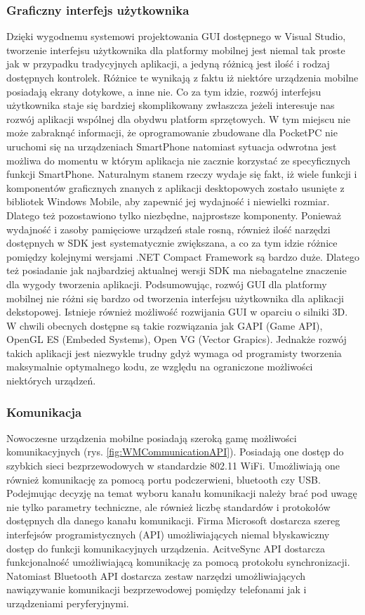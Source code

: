 \subsubsection{Graficzny interfejs użytkownika}
Dzięki wygodnemu systemowi projektowania GUI dostępnego w Visual Studio, tworzenie
interfejsu użytkownika dla platformy mobilnej jest niemal tak proste jak w
przypadku tradycyjnych aplikacji, a jedyną różnicą jest ilość i rodzaj dostępnych
kontrolek. Różnice te wynikają z faktu iż niektóre urządzenia mobilne posiadają
ekrany dotykowe, a inne nie. Co za tym idzie, rozwój interfejsu użytkownika staje
się bardziej skomplikowany zwłaszcza jeżeli interesuje nas rozwój aplikacji
wspólnej dla obydwu platform sprzętowych. W tym miejscu nie może zabraknąć
informacji, że oprogramowanie zbudowane dla PocketPC nie uruchomi się na
urządzeniach SmartPhone natomiast sytuacja odwrotna jest możliwa do momentu w
którym aplikacja nie zacznie korzystać ze specyficznych funkcji SmartPhone.
Naturalnym stanem rzeczy wydaje się fakt, iż wiele funkcji i komponentów
graficznych znanych z aplikacji desktopowych zostało usunięte z bibliotek Windows
Mobile, aby zapewnić jej wydajność i niewielki rozmiar. Dlatego też pozostawiono
tylko niezbędne, najprostsze komponenty. Ponieważ wydajność  i zasoby pamięciowe
urządzeń stale rosną, również ilość narzędzi dostępnych w SDK jest systematycznie
zwiększana, a co za tym idzie różnice pomiędzy kolejnymi wersjami .NET Compact
Framework są bardzo duże. Dlatego też posiadanie jak najbardziej aktualnej wersji
SDK ma niebagatelne znaczenie dla wygody tworzenia aplikacji. Podsumowując, rozwój
GUI dla platformy mobilnej nie różni się bardzo od tworzenia interfejsu
użytkownika dla aplikacji dekstopowej. Istnieje również możliwość rozwijania GUI
w oparciu o silniki 3D. W chwili obecnych dostępne są takie rozwiązania jak GAPI
(Game API), OpenGL ES (Embeded Systems), Open VG (Vector Grapics). Jednakże
rozwój takich aplikacji jest niezwykle trudny gdyż wymaga od programisty
tworzenia maksymalnie optymalnego kodu, ze względu na ograniczone możliwości
niektórych urządzeń.

\subsubsection{Komunikacja}
Nowoczesne urządzenia mobilne posiadają szeroką gamę możliwości komunikacyjnych
(rys. \ref{fig:WMCommunicationAPI}). Posiadają one dostęp do szybkich sieci
bezprzewodowych w standardzie 802.11 WiFi. Umożliwiają one również komunikację za pomocą portu podczerwieni, bluetooth czy
USB. Podejmując decyzję na temat wyboru kanału komunikacji należy brać pod uwagę
nie tylko parametry techniczne, ale również liczbę standardów i protokołów
dostępnych dla danego kanału komunikacji. Firma Microsoft dostarcza szereg
interfejsów programistycznych (API) umożliwiających niemal błyskawiczny dostęp do
funkcji komunikacyjnych urządzenia. AcitveSync API dostarcza funkcjonalność
umożliwiającą komunikację za pomocą protokołu synchronizacji. Natomiast Bluetooth
API dostarcza zestaw narzędzi umożliwiających nawiązywanie komunikacji
bezprzewodowej pomiędzy telefonami jak i urządzeniami peryferyjnymi.


